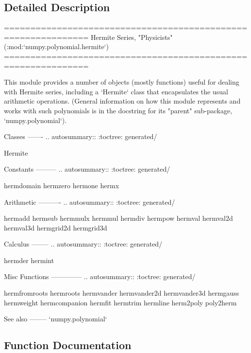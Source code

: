 \subsection{Detailed Description}
\begin{DoxyVerb}==============================================================
Hermite Series, "Physicists" (:mod:`numpy.polynomial.hermite`)
==============================================================

This module provides a number of objects (mostly functions) useful for
dealing with Hermite series, including a `Hermite` class that
encapsulates the usual arithmetic operations.  (General information
on how this module represents and works with such polynomials is in the
docstring for its "parent" sub-package, `numpy.polynomial`).

Classes
-------
.. autosummary::
   :toctree: generated/

   Hermite

Constants
---------
.. autosummary::
   :toctree: generated/

   hermdomain
   hermzero
   hermone
   hermx

Arithmetic
----------
.. autosummary::
   :toctree: generated/

   hermadd
   hermsub
   hermmulx
   hermmul
   hermdiv
   hermpow
   hermval
   hermval2d
   hermval3d
   hermgrid2d
   hermgrid3d

Calculus
--------
.. autosummary::
   :toctree: generated/

   hermder
   hermint

Misc Functions
--------------
.. autosummary::
   :toctree: generated/

   hermfromroots
   hermroots
   hermvander
   hermvander2d
   hermvander3d
   hermgauss
   hermweight
   hermcompanion
   hermfit
   hermtrim
   hermline
   herm2poly
   poly2herm

See also
--------
`numpy.polynomial`\end{DoxyVerb}
 

\subsection{Function Documentation}
\mbox{\label{namespacenumpy_1_1polynomial_1_1hermite_ab623029878ab9c87eed73daa35c3c833}} 
